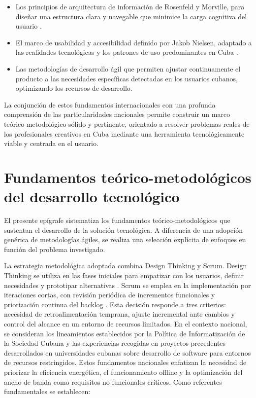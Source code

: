 \begin{itemize}
    \item Los principios de arquitectura de información de Rosenfeld y Morville, para diseñar una estructura clara y navegable que minimice la carga cognitiva del usuario \citep{Rosenfeld2015}.
    
    \item El marco de usabilidad y accesibilidad definido por Jakob Nielsen, adaptado a las realidades tecnológicas y los patrones de uso predominantes en Cuba \citep{Nielsen2024}.
    
    \item Las metodologías de desarrollo ágil que permiten ajustar continuamente el producto a las necesidades específicas detectadas en los usuarios cubanos, optimizando los recursos de desarrollo.
    
\end{itemize}

La conjunción de estos fundamentos internacionales con una profunda comprensión de las particularidades nacionales permite construir un marco teórico-metodológico sólido y pertinente, orientado a resolver problemas reales de los profesionales creativos en Cuba mediante una herramienta tecnológicamente viable y centrada en el usuario.

\section{Fundamentos teórico-metodológicos del desarrollo tecnológico}

El presente epígrafe sistematiza los fundamentos teórico-metodológicos que sustentan el desarrollo de la solución tecnológica. A diferencia de una adopción genérica de metodologías ágiles, se realiza una selección explícita de enfoques en función del problema investigado.

La estrategia metodológica adoptada combina Design Thinking y Scrum. Design Thinking se utiliza en las fases iniciales para empatizar con los usuarios, definir necesidades y prototipar alternativas \citep{Brown2008}. Scrum se emplea en la implementación por iteraciones cortas, con revisión periódica de incrementos funcionales y priorización continua del backlog \citep{SchwaberSutherland2020}. Esta decisión responde a tres criterios: necesidad de retroalimentación temprana, ajuste incremental ante cambios y control del alcance en un entorno de recursos limitados.
En el contexto nacional, se consideran los lineamientos establecidos por la Política de Informatización de la Sociedad Cubana y las experiencias recogidas en proyectos precedentes desarrollados en universidades cubanas sobre desarrollo de software para entornos de recursos restringidos. Estos fundamentos nacionales enfatizan la necesidad de priorizar la eficiencia energética, el funcionamiento offline y la optimización del ancho de banda como requisitos no funcionales críticos.
Como referentes fundamentales se establecen:

